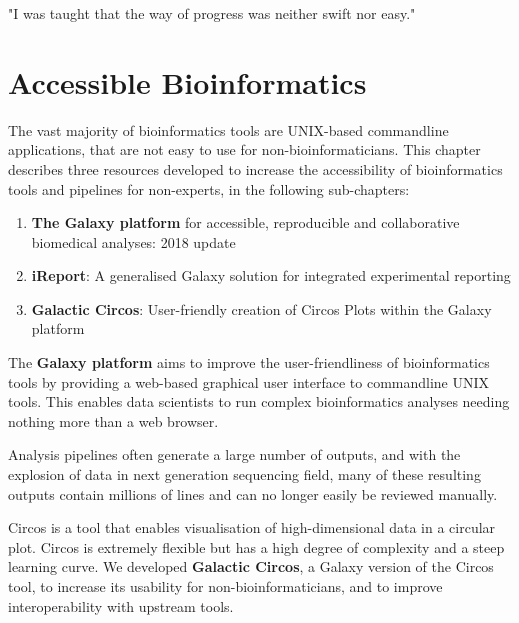 \begin{savequote}[75mm]
"I was taught that the way of progress was neither swift nor easy."
\end{savequote}

\chapter{Accessible Bioinformatics}\label{chapter:general}
\setcounter{figure}{-1}
\setcounter{table}{-1}
\setcounter{section}{-1}
\setcounter{NAT@ctr}{-1}

\begin{comment}
iReport, Circos?, myFAIR?, Galaxy2018update? (I am co-author and technically everybody is
shared first on that? would fit nicely with the overall story as every other paper connects
to Galaxy.)
- Training paper in its own section or add it here?
\end{comment}

The vast majority of bioinformatics tools are UNIX-based commandline applications, that are not easy to use for non-bioinformaticians. This chapter describes three resources developed to increase the accessibility of bioinformatics tools and pipelines for non-experts, in the following sub-chapters:

\begin{enumerate}
\itemsep-0.5em
\item \textbf{The Galaxy platform} for accessible, reproducible and collaborative biomedical analyses: 2018 update
\item \textbf{iReport}: A generalised Galaxy solution for integrated experimental reporting
\item \textbf{Galactic Circos}: User-friendly creation of Circos Plots within the Galaxy platform
\end{enumerate}

The \textbf{Galaxy platform} aims to improve the user-friendliness of bioinformatics tools by providing a web-based graphical user interface to commandline UNIX tools. This enables data scientists to run complex bioinformatics analyses needing nothing more than a web browser.

Analysis pipelines often generate a large number of outputs, and with the explosion of data in next generation sequencing field, many of these resulting outputs contain millions of lines and can no longer easily be reviewed manually.

Circos is a tool that enables visualisation of high-dimensional data in a circular plot. Circos is extremely flexible but has a high degree of complexity and a steep learning curve. We developed \textbf{Galactic Circos}, a Galaxy version of the Circos tool, to increase its usability for non-bioinformaticians, and to improve interoperability with upstream tools.

